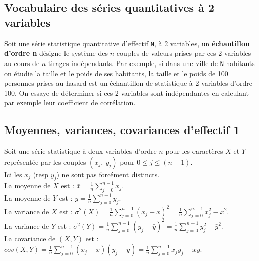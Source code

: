 \documentclass[a4paper,11pt]{book}
\begin{document}
\subsection{Vocabulaire des s\'eries quantitatives \`a 2 variables}
Soit une s\'erie statistique quantitative d'effectif {\tt N}, \`a 2 variables, 
un {\bf \'echantillon d'ordre n} d\'esigne le syst\`eme des $n$ couples de 
valeurs prises par ces 2 variables au cours de $n$ tirages ind\'ependants.
Par exemple, si dans une ville de {\tt N} habitants on \'etudie la taille et le
poids de ses habitants, la taille et le poids de 100 personnes prises au hasard
est un \'echantillon de statistique \`a 2 variables d'ordre 100. 
On essaye de d\'eterminer si ces 2 variables sont ind\'ependantes
en calculant par exemple leur coefficient de corr\'elation.
\subsection{Moyennes, variances, covariances d'effectif 1}
Soit une s\'erie statistique \`a deux variables d'ordre $n$ 
pour les caract\`eres $X$ et $Y$ repr\'esent\'ee par les couples $(x_j,\ y_j)$ 
 pour $0 \leq j \leq (n-1)$.\\
Ici les $x_j$ (resp $y_j$) ne sont pas forc\'ement distincts.\\
La moyenne de $X$ est : $\bar x= \frac{1}{n}\sum_{j=0}^{n-1} x_j$.\\
La moyenne de $Y$ est : $\bar y= \frac{1}{n}\sum_{j=0}^{n-1} y_j$.\\
La variance de $X$ est : $\sigma^2(X)= \frac{1}{n}\sum_{j=0}^{n-1} (x_j-\bar x)^2 =\frac{1}{n}\sum_{j=0}^{n-1} x_j^2-\bar x^2$.\\
La variance de $Y$ est : $\sigma^2(Y)= \frac{1}{n}\sum_{j=0}^{n-1} (y_j-\bar y)^2 =\frac{1}{n}\sum_{j=0}^{n-1} y_j^2-\bar y^2$.\\
La covariance de $(X,Y)$ est :\\
 $cov(X,Y)= \frac{1}{n}\sum_{j=0}^{n-1} (x_j-\bar x)(y_j-\bar y) =\frac{1}{n}\sum_{j=0}^{n-1} x_jy_j-\bar x\bar y$.
\end{document}
